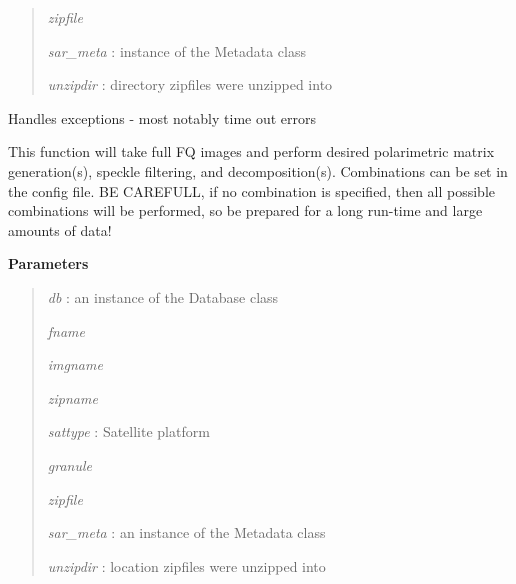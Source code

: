 \documentclass[letterpaper,10pt,openany,oneside]{sphinxmanual}
\begin{document}
\begin{fulllineitems}
\begin{fulllineitems}
\begin{quote}
\emph{zipfile}

\emph{sar\_meta} : instance of the Metadata class

\emph{unzipdir} : directory zipfiles were unzipped into
\end{quote}

\end{fulllineitems}


\begin{fulllineitems}
\label{code:SigLib.SigLib.handler}
Handles exceptions - most notably time out errors

\end{fulllineitems}


\begin{fulllineitems}
\label{code:SigLib.SigLib.polarimetric}
This function will take full FQ images and perform desired polarimetric matrix generation(s), speckle filtering, and decomposition(s). 
Combinations can be set in the config file. BE CAREFULL, if no combination is specified, then all possible combinations will be performed, 
so be prepared for a long run-time and large amounts of data!

\textbf{Parameters}
\begin{quote}

\emph{db} : an instance of the Database class

\emph{fname}

\emph{imgname}

\emph{zipname}

\emph{sattype} : Satellite platform

\emph{granule}

\emph{zipfile}

\emph{sar\_meta} : an instance of the Metadata class

\emph{unzipdir} : location zipfiles were unzipped into
\end{quote}

\end{fulllineitems}



\end{fulllineitems}
\end{document}
